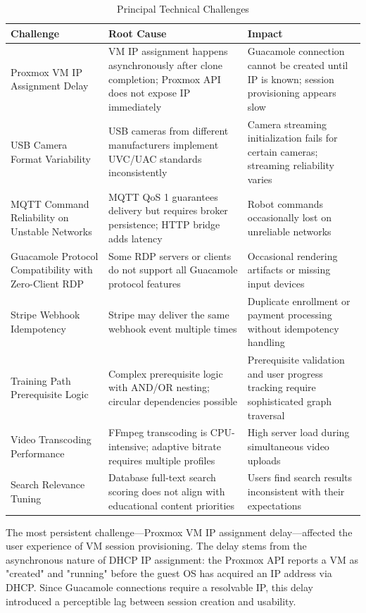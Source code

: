 \begin{table}[H]
\centering
\caption{Principal Technical Challenges}
\label{tab:technical-challenges}
\begin{tabular}{|p{4.5cm}|p{4.5cm}|p{5.5cm}|}
\hline
\textbf{Challenge} & \textbf{Root Cause} & \textbf{Impact} \\
\hline
Proxmox VM IP Assignment Delay & VM IP assignment happens asynchronously after clone completion; Proxmox API does not expose IP immediately & Guacamole connection cannot be created until IP is known; session provisioning appears slow \\
\hline
USB Camera Format Variability & USB cameras from different manufacturers implement UVC/UAC standards inconsistently & Camera streaming initialization fails for certain cameras; streaming reliability varies \\
\hline
MQTT Command Reliability on Unstable Networks & MQTT QoS 1 guarantees delivery but requires broker persistence; HTTP bridge adds latency & Robot commands occasionally lost on unreliable networks \\
\hline
Guacamole Protocol Compatibility with Zero-Client RDP & Some RDP servers or clients do not support all Guacamole protocol features & Occasional rendering artifacts or missing input devices \\
\hline
Stripe Webhook Idempotency & Stripe may deliver the same webhook event multiple times & Duplicate enrollment or payment processing without idempotency handling \\
\hline
Training Path Prerequisite Logic & Complex prerequisite logic with AND/OR nesting; circular dependencies possible & Prerequisite validation and user progress tracking require sophisticated graph traversal \\
\hline
Video Transcoding Performance & FFmpeg transcoding is CPU-intensive; adaptive bitrate requires multiple profiles & High server load during simultaneous video uploads \\
\hline
Search Relevance Tuning & Database full-text search scoring does not align with educational content priorities & Users find search results inconsistent with their expectations \\
\hline
\end{tabular}
\end{table}

The most persistent challenge---Proxmox VM IP assignment delay---affected the user experience of VM session provisioning. The delay stems from the asynchronous nature of DHCP IP assignment: the Proxmox API reports a VM as "created" and "running" before the guest OS has acquired an IP address via DHCP. Since Guacamole connections require a resolvable IP, this delay introduced a perceptible lag between session creation and usability.

